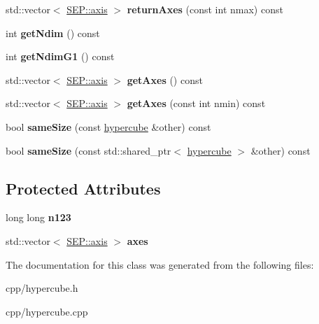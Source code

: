 \begin{DoxyCompactItemize}
std\+::vector$<$ \hyperlink{class_s_e_p_1_1axis}{S\+E\+P\+::axis} $>$ {\bfseries return\+Axes} (const int nmax) const
\item 
\mbox{\label{class_s_e_p_1_1hypercube_aa1924e8cb2d1893c305970beb327ae2a}} 
int {\bfseries get\+Ndim} () const
\item 
\mbox{\label{class_s_e_p_1_1hypercube_a35995082d417a2ddd9363071d180a903}} 
int {\bfseries get\+Ndim\+G1} () const
\item 
\mbox{\label{class_s_e_p_1_1hypercube_a3ae9b97f3a31fe22d7b037d47b35c1b0}} 
std\+::vector$<$ \hyperlink{class_s_e_p_1_1axis}{S\+E\+P\+::axis} $>$ {\bfseries get\+Axes} () const
\item 
\mbox{\label{class_s_e_p_1_1hypercube_ab4c9a66c3b1a788ff6f855544abf6017}} 
std\+::vector$<$ \hyperlink{class_s_e_p_1_1axis}{S\+E\+P\+::axis} $>$ {\bfseries get\+Axes} (const int nmin) const
\item 
\mbox{\label{class_s_e_p_1_1hypercube_ae3b18d83e8987299293e54ccc8c03cd0}} 
bool {\bfseries same\+Size} (const \hyperlink{class_s_e_p_1_1hypercube}{hypercube} \&other) const
\item 
\mbox{\label{class_s_e_p_1_1hypercube_a8d038fea25375cecbe7db90e356cd4be}} 
bool {\bfseries same\+Size} (const std\+::shared\+\_\+ptr$<$ \hyperlink{class_s_e_p_1_1hypercube}{hypercube} $>$ \&other) const
\end{DoxyCompactItemize}
\subsection*{Protected Attributes}
\begin{DoxyCompactItemize}
\item 
\mbox{\label{class_s_e_p_1_1hypercube_a16d2908d1e37f8615fdcbc4c490f56da}} 
long long {\bfseries n123}
\item 
\mbox{\label{class_s_e_p_1_1hypercube_ab59f72c8f02bc12eedb27e9863a03b5c}} 
std\+::vector$<$ \hyperlink{class_s_e_p_1_1axis}{S\+E\+P\+::axis} $>$ {\bfseries axes}
\end{DoxyCompactItemize}


The documentation for this class was generated from the following files\+:\begin{DoxyCompactItemize}
\item 
cpp/hypercube.\+h\item 
cpp/hypercube.\+cpp\end{DoxyCompactItemize}
